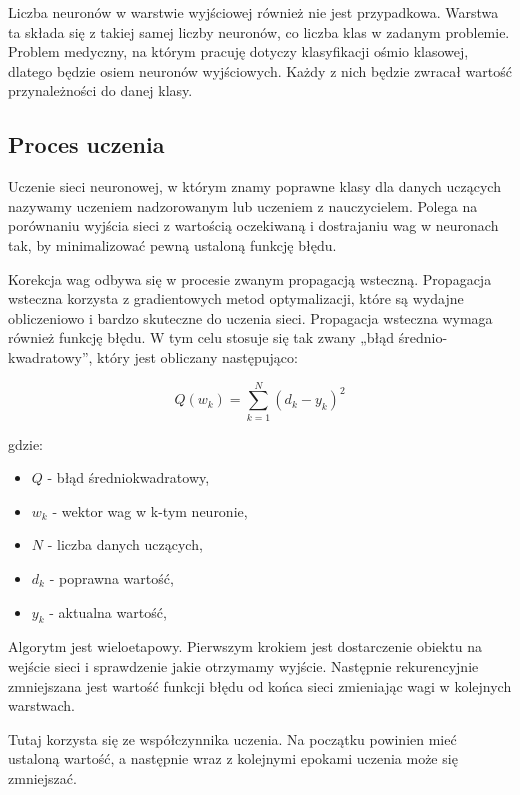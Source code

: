\documentclass{report}
\begin{document}
    Liczba neuronów w warstwie wyjściowej również nie jest przypadkowa.
    Warstwa ta składa się z takiej samej liczby neuronów, co liczba klas w zadanym problemie.
    Problem medyczny, na którym pracuję dotyczy klasyfikacji ośmio klasowej, dlatego będzie osiem neuronów wyjściowych.
    Każdy z nich będzie zwracał wartość przynależności do danej klasy.

    \subsection{Proces uczenia}\label{subsec:procesUczenia}

    Uczenie sieci neuronowej, w którym znamy poprawne klasy dla danych uczących nazywamy uczeniem nadzorowanym lub uczeniem z nauczycielem.
    Polega na porównaniu wyjścia sieci z wartością oczekiwaną i dostrajaniu wag w neuronach tak, by minimalizować pewną ustaloną funkcję błędu.

    Korekcja wag odbywa się w procesie zwanym propagacją wsteczną.
    Propagacja wsteczna korzysta z gradientowych metod optymalizacji, które są wydajne obliczeniowo i bardzo skuteczne do uczenia sieci.
    Propagacja wsteczna wymaga również funkcję błędu.
    W tym celu stosuje się tak zwany „błąd średnio-kwadratowy”, który jest obliczany następująco:

    \[
        Q(w_k) = \sum_{k=1}^{N}{(d_k - y_k) ^ 2}
    \]

    gdzie:

    \begin{itemize}
        \item $Q$ - błąd średniokwadratowy,
        \item $w_k$ - wektor wag w k-tym neuronie,
        \item $N$ - liczba danych uczących,
        \item $d_k$ - poprawna wartość,
        \item $y_k$ - aktualna wartość,
    \end{itemize}

    Algorytm jest wieloetapowy.
    Pierwszym krokiem jest dostarczenie obiektu na wejście sieci i sprawdzenie jakie otrzymamy wyjście.
    Następnie rekurencyjnie zmniejszana jest wartość funkcji błędu od końca sieci zmieniając wagi w kolejnych warstwach.

    Tutaj korzysta się ze współczynnika uczenia.
    Na początku powinien mieć ustaloną wartość, a następnie wraz z kolejnymi epokami uczenia może się zmniejszać.
\end{document}
